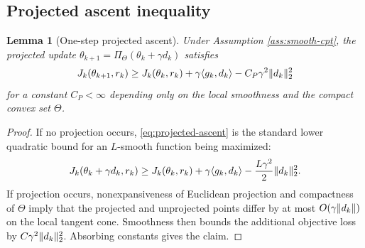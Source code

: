 \documentclass[11pt]{article}
\newtheorem{lemma}[theorem]{Lemma}
\newcommand{\1}{\mathbf 1}
\DeclarePairedDelimiter{\norm}{\lVert}{\rVert}
\DeclarePairedDelimiter{\ip}{\langle}{\rangle}
\newcommand{\ThetaSet}{\Theta}
\begin{document}
\subsection{Projected ascent inequality}
\begin{lemma}[One-step projected ascent]\label{lem:projected-ascent}
Under Assumption \ref{ass:smooth-cpt}, the projected update $\theta_{k+1}=\Pi_{\ThetaSet}(\theta_k+\gamma d_k)$ satisfies
\begin{equation}\label{eq:projected-ascent}
 J_k(\theta_{k+1},r_k)
 \ge J_k(\theta_k,r_k)+\gamma\ip{g_k,d_k}-C_P\gamma^2\norm{d_k}_2^2
\end{equation}
for a constant $C_P<\infty$ depending only on the local smoothness and the compact convex set $\ThetaSet$.
\end{lemma}
\begin{proof}
If no projection occurs, \eqref{eq:projected-ascent} is the standard lower quadratic bound for an $L$-smooth function being maximized:
\[
 J_k(\theta_k+\gamma d_k,r_k)
 \ge J_k(\theta_k,r_k)+\gamma\ip{g_k,d_k}-{L\gamma^2\over2}\norm{d_k}_2^2.
\]
If projection occurs, nonexpansiveness of Euclidean projection and compactness of $\ThetaSet$ imply that the projected and unprojected points differ by at most $O(\gamma\norm{d_k})$ on the local tangent cone.  Smoothness then bounds the additional objective loss by $C\gamma^2\norm{d_k}_2^2$.  Absorbing constants gives the claim.
\end{proof}
\end{document}
